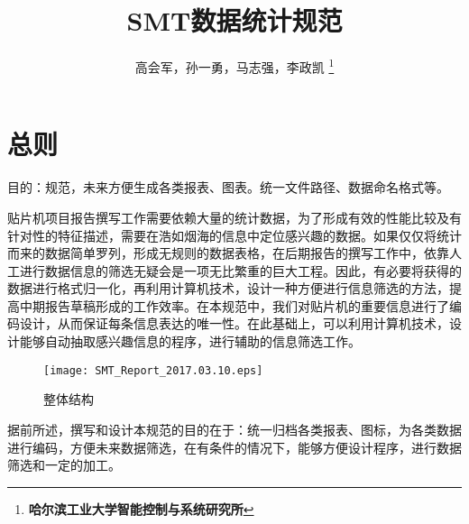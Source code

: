 \documentclass[a4paper,12pt,UTF8]{article}
\begin{document}
\title{SMT数据统计规范}
\author{高会军，孙一勇，马志强，李政凯
\thanks{\textbf{哈尔滨工业大学智能控制与系统研究所}}
\date{\CurrentDate} %
}
\maketitle


\section{总则}
目的：规范，未来方便生成各类报表、图表。统一文件路径、数据命名格式等。

贴片机项目报告撰写工作需要依赖大量的统计数据，为了形成有效的性能比较及有针对性的特征描述，需要在浩如烟海的信息中定位感兴趣的数据。如果仅仅将统计而来的数据简单罗列，形成无规则的数据表格，在后期报告的撰写工作中，依靠人工进行数据信息的筛选无疑会是一项无比繁重的巨大工程。因此，有必要将获得的数据进行格式归一化，再利用计算机技术，设计一种方便进行信息筛选的方法，提高中期报告草稿形成的工作效率。在本规范中，我们对贴片机的重要信息进行了编码设计，从而保证每条信息表达的唯一性。在此基础上，可以利用计算机技术，设计能够自动抽取感兴趣信息的程序，进行辅助的信息筛选工作。

\begin{figure}%
\centering
\texttt{[image: SMT\_Report\_2017.03.10.eps]}
\caption{整体结构}
\label{FigLabel_Section1_StructurePicture}
\end{figure}


据前所述，撰写和设计本规范的目的在于：统一归档各类报表、图标，为各类数据进行编码，方便未来数据筛选，在有条件的情况下，能够方便设计程序，进行数据筛选和一定的加工。
\end{document}
